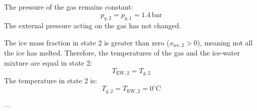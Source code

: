 The pressure of the gas remains constant:  
\[
p_{g,2} = p_{g,1} = 1.4 \, \text{bar}
\]  
The external pressure acting on the gas has not changed.  

The ice mass fraction in state 2 is greater than zero (\( x_{\text{ice},2} > 0 \)), meaning not all the ice has melted. Therefore, the temperatures of the gas and the ice-water mixture are equal in state 2:  
\[
T_{\text{EW},2} = T_{g,2}
\]  
The temperature in state 2 is:  
\[
T_{g,2} = T_{\text{EW},2} = 0^\circ\text{C}
\]  

---